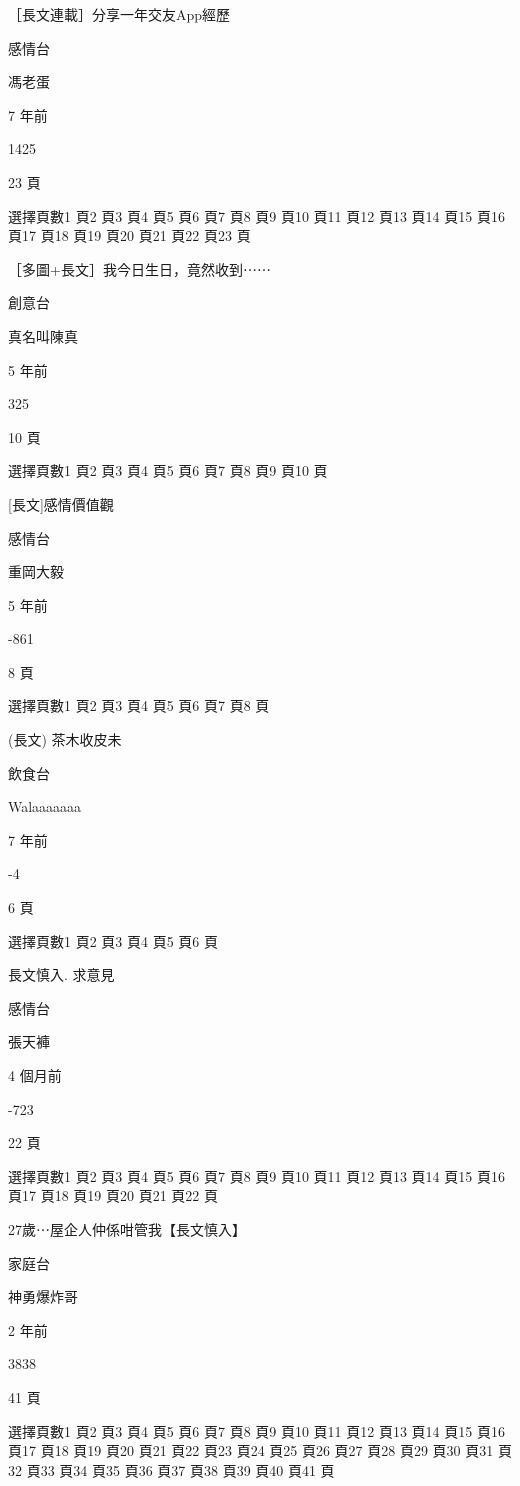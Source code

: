 ［長文連載］分享一年交友App經歷

感情台

馮老蛋

7 年前

1425

23 頁

選擇頁數1 頁2 頁3 頁4 頁5 頁6 頁7 頁8 頁9 頁10 頁11 頁12 頁13 頁14 頁15 頁16 頁17 頁18 頁19 頁20 頁21 頁22 頁23 頁

［多圖+長文］我今日生日，竟然收到⋯⋯

創意台

真名叫陳真

5 年前

325

10 頁

選擇頁數1 頁2 頁3 頁4 頁5 頁6 頁7 頁8 頁9 頁10 頁

[長文]感情價值觀

感情台

重岡大毅

5 年前

-861

8 頁

選擇頁數1 頁2 頁3 頁4 頁5 頁6 頁7 頁8 頁

(長文) 茶木收皮未

飲食台

Walaaaaaaa

7 年前

-4

6 頁

選擇頁數1 頁2 頁3 頁4 頁5 頁6 頁

長文慎入. 求意見

感情台

張天褲

4 個月前

-723

22 頁

選擇頁數1 頁2 頁3 頁4 頁5 頁6 頁7 頁8 頁9 頁10 頁11 頁12 頁13 頁14 頁15 頁16 頁17 頁18 頁19 頁20 頁21 頁22 頁

27歲⋯屋企人仲係咁管我【長文慎入】

家庭台

神勇爆炸哥

2 年前

3838

41 頁

選擇頁數1 頁2 頁3 頁4 頁5 頁6 頁7 頁8 頁9 頁10 頁11 頁12 頁13 頁14 頁15 頁16 頁17 頁18 頁19 頁20 頁21 頁22 頁23 頁24 頁25 頁26 頁27 頁28 頁29 頁30 頁31 頁32 頁33 頁34 頁35 頁36 頁37 頁38 頁39 頁40 頁41 頁


